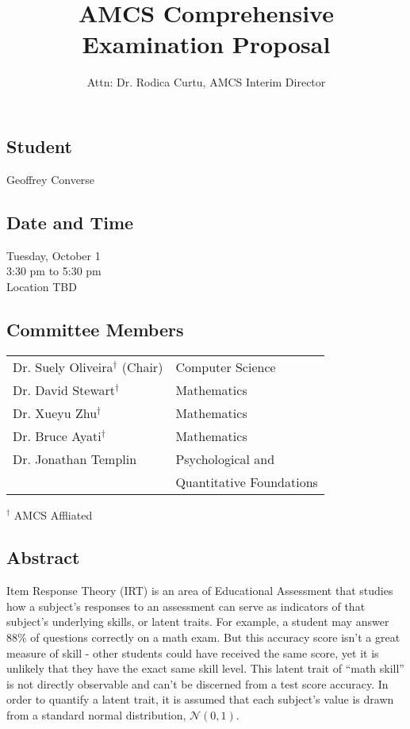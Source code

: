 \documentclass[a4paper]{article}
\title{AMCS Comprehensive Examination Proposal}
\author{Attn: Dr. Rodica Curtu, AMCS Interim Director}
\begin{document}
\maketitle

\begin{multicols}{2}
\subsection*{Student}
Geoffrey Converse

\subsection*{Date and Time}
Tuesday, October 1 \\
3:30 pm to 5:30 pm \\
Location TBD
\columnbreak

\subsection*{Committee Members}
\begin{tabular}{ll}

	 Dr. Suely Oliveira$^\dagger$ (Chair) & Computer Science \\
	 Dr. David Stewart$^\dagger$ & Mathematics\\
	 Dr. Xueyu Zhu$^\dagger$ & Mathematics\\
	 Dr. Bruce Ayati$^\dagger$ & Mathematics\\
	 Dr. Jonathan Templin & Psychological and \\ & Quantitative Foundations\\
\end{tabular}
\begin{center}$^\dagger$ AMCS Affliated\end{center}
\end{multicols}

\hfill

\subsection*{Abstract}
Item Response Theory (IRT) is an area of Educational Assessment that studies how a subject's responses to an assessment can serve as indicators of that subject's underlying skills, or latent traits. For example, a student may answer $88\%$ of questions correctly on a math exam. But this accuracy score isn't a great measure of skill - other students could have received the same score, yet it is unlikely that they have the exact same skill level. This latent trait of ``math skill'' is not directly observable and can't be discerned from a test score accuracy. In order to quantify a latent trait, it is assumed that each subject's value is drawn from a standard normal distribution, $\mathcal{N}(0,1)$.
\end{document}

